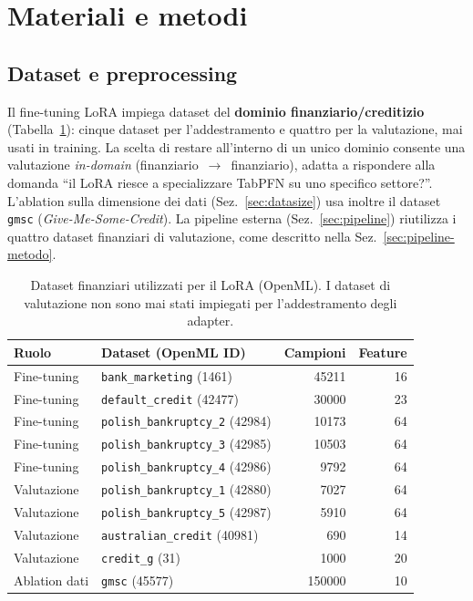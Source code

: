 \documentclass[11pt,a4paper]{article}
\begin{document}
\section{Materiali e metodi}
\label{sec:metodi}

\subsection{Dataset e preprocessing}
Il fine-tuning LoRA impiega dataset del \textbf{dominio finanziario/creditizio}
(Tabella~\ref{tab:dataset}): cinque dataset per l'addestramento e quattro per la
valutazione, mai usati in training. La scelta di restare all'interno di un unico
dominio consente una valutazione \emph{in-domain} (finanziario~$\to$~finanziario),
adatta a rispondere alla domanda ``il LoRA riesce a specializzare TabPFN su uno
specifico settore?''. L'ablation sulla dimensione dei dati (Sez.~\ref{sec:datasize})
usa inoltre il dataset \texttt{gmsc} (\emph{Give-Me-Some-Credit}). La pipeline
esterna (Sez.~\ref{sec:pipeline}) riutilizza i quattro dataset finanziari di
valutazione, come descritto nella Sez.~\ref{sec:pipeline-metodo}.

\begin{table}[h]
\centering
\caption{Dataset finanziari utilizzati per il LoRA (OpenML). I dataset di
valutazione non sono mai stati impiegati per l'addestramento degli adapter.}
\label{tab:dataset}
\small
\begin{tabular}{llrr}
\toprule
Ruolo & Dataset (OpenML ID) & Campioni & Feature \\
\midrule
Fine-tuning & \texttt{bank\_marketing} (1461)      & 45211 & 16 \\
Fine-tuning & \texttt{default\_credit} (42477)     & 30000 & 23 \\
Fine-tuning & \texttt{polish\_bankruptcy\_2} (42984) & 10173 & 64 \\
Fine-tuning & \texttt{polish\_bankruptcy\_3} (42985) & 10503 & 64 \\
Fine-tuning & \texttt{polish\_bankruptcy\_4} (42986) & 9792  & 64 \\
\midrule
Valutazione & \texttt{polish\_bankruptcy\_1} (42880) & 7027  & 64 \\
Valutazione & \texttt{polish\_bankruptcy\_5} (42987) & 5910  & 64 \\
Valutazione & \texttt{australian\_credit} (40981)  & 690   & 14 \\
Valutazione & \texttt{credit\_g} (31)              & 1000  & 20 \\
\midrule
Ablation dati & \texttt{gmsc} (45577)              & 150000 & 10 \\
\bottomrule
\end{tabular}
\end{table}
\end{document}
